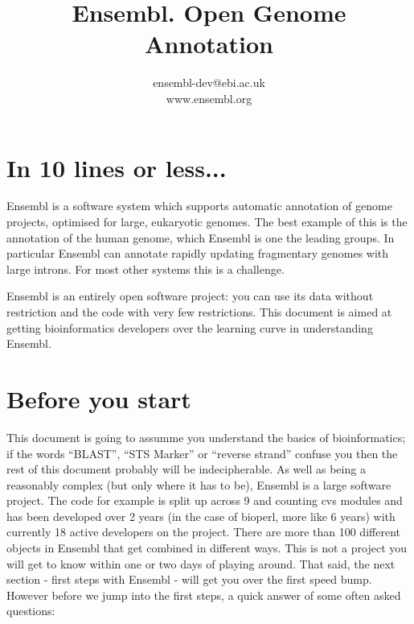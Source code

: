 \documentclass[11pt,a4paper]{article}
\begin{document}
\title{Ensembl. Open Genome Annotation}
\author{ensembl-dev@ebi.ac.uk\\www.ensembl.org}


\maketitle

\newpage
\tableofcontents
\newpage

 
\newpage

\section{In 10 lines or less...}

Ensembl is a software system which supports automatic annotation of
genome projects, optimised for large, eukaryotic genomes. The best
example of this is the annotation of the human genome, which Ensembl
is one the leading groups. In particular Ensembl can annotate rapidly
updating fragmentary genomes with large introns. For most other systems
this is a challenge.

Ensembl is an entirely open software project: you can use its data
without restriction and the code with very few restrictions. This
document is aimed at getting bioinformatics developers over the
learning curve in understanding Ensembl.

\section{Before you start}

This document is going to assumme you understand the basics of
bioinformatics; if the words ``BLAST'', ``STS Marker'' or ``reverse
strand'' confuse you then the rest of this document probably will be
indecipherable. As well as being a reasonably complex (but only where
it has to be), Ensembl is a large software project. The code for
example is split up across 9 and counting cvs modules and has been
developed over 2 years (in the case of bioperl, more like 6 years)
with currently 18 active developers on the project. There are more
than 100 different objects in Ensembl that get combined in different
ways.  This is not a project you will get to know within one or two
days of playing around. That said, the next section - first steps with
Ensembl - will get you over the first speed bump. However before we
jump into the first steps, a quick answer of some often asked
questions:
\end{document}
